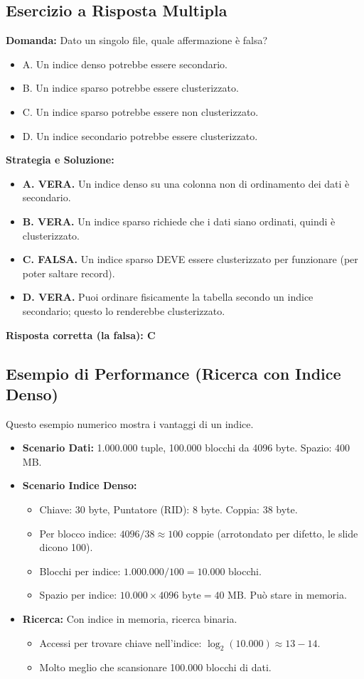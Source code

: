 \subsection{Esercizio a Risposta Multipla}
\textbf{Domanda:} Dato un singolo file, quale affermazione è falsa?
\begin{itemize}
    \item A. Un indice denso potrebbe essere secondario.
    \item B. Un indice sparso potrebbe essere clusterizzato.
    \item C. Un indice sparso potrebbe essere non clusterizzato.
    \item D. Un indice secondario potrebbe essere clusterizzato.
\end{itemize}
\textbf{Strategia e Soluzione:}
\begin{itemize}
    \item \textbf{A. VERA.} Un indice denso su una colonna non di ordinamento dei dati è secondario.
    \item \textbf{B. VERA.} Un indice sparso richiede che i dati siano ordinati, quindi è clusterizzato.
    \item \textbf{C. FALSA.} Un indice sparso DEVE essere clusterizzato per funzionare (per poter saltare record).
    \item \textbf{D. VERA.} Puoi ordinare fisicamente la tabella secondo un indice secondario; questo lo renderebbe clusterizzato.
\end{itemize}
\textbf{Risposta corretta (la falsa): C}

\subsection{Esempio di Performance (Ricerca con Indice Denso)}
Questo esempio numerico mostra i vantaggi di un indice.
\begin{itemize}
    \item \textbf{Scenario Dati:} 1.000.000 tuple, 100.000 blocchi da 4096 byte. Spazio: 400 MB.
    \item \textbf{Scenario Indice Denso:}
    \begin{itemize}
        \item Chiave: 30 byte, Puntatore (RID): 8 byte. Coppia: 38 byte.
        \item Per blocco indice: $4096 / 38 \approx 100$ coppie (arrotondato per difetto, le slide dicono 100).
        \item Blocchi per indice: $1.000.000 / 100 = 10.000$ blocchi.
        \item Spazio per indice: $10.000 \times 4096 \text{ byte} = 40 \text{ MB}$. Può stare in memoria.
    \end{itemize}
    \item \textbf{Ricerca:} Con indice in memoria, ricerca binaria.
    \begin{itemize}
        \item Accessi per trovare chiave nell'indice: $\log_2(10.000) \approx 13-14$.
        \item Molto meglio che scansionare 100.000 blocchi di dati.
    \end{itemize}
\end{itemize}


